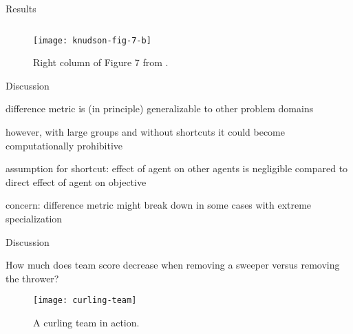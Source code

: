 \begin{frame}{Results}

\begin{figure}

\begin{columns}
\begin{column}{0.7\textwidth}
\texttt{[image: knudson-fig-7-b]}
\end{column}
\begin{column}{0.3\textwidth}
\caption{
Right column of Figure 7 from \cite{knudson2010coevolution}.
}
\end{column}
\end{columns}

\end{figure}

\end{frame}

\begin{frame}{Discussion}

difference metric is (in principle) generalizable to other problem domains

however, with large groups and without shortcuts it could become computationally prohibitive

assumption for shortcut:
effect of agent on other agents is negligible compared to direct effect of agent on objective

concern:
difference metric might break down in some cases with extreme specialization

\end{frame}

\begin{frame}{Discussion}

How much does team score decrease when removing a sweeper versus removing the thrower?

\begin{figure}
\texttt{[image: curling-team]}
\caption{A curling team in action.}
\label{fig:curling-team}
\end{figure}

\end{frame}
